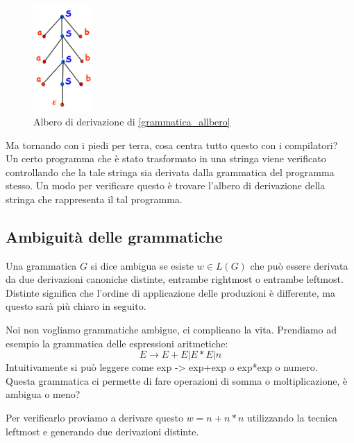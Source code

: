 \documentclass[class=book, crop=false, oneside, 12pt]{standalone}
\begin{document}
\begin{figure}[H]
	\centering
	\includegraphics[width=0.2\textwidth,keepaspectratio]{albero_di_derivazione}
    \caption{Albero di derivazione di \ref{grammatica_allbero}}
    \label{albero_di_derivazione}
\end{figure}
Ma tornando con i piedi per terra, cosa centra tutto questo con i compilatori?\\
Un certo programma che è stato trasformato in una stringa viene verificato controllando che la tale stringa sia derivata dalla grammatica del programma stesso. Un modo per verificare questo è trovare l’albero di derivazione della stringa che rappresenta il tal programma.

\subsection{Ambiguità delle grammatiche}
Una grammatica $G$ si dice ambigua se esiste $w \in L(G)$ che può essere derivata da due derivazioni canoniche distinte, entrambe rightmost o entrambe leftmost. Distinte significa che l'ordine di applicazione delle produzioni è differente, ma questo sarà più chiaro in seguito.

Noi non vogliamo grammatiche ambigue, ci complicano la vita.
Prendiamo ad esempio la grammatica delle espressioni aritmetiche:
\begin{equation}
    E \to E+E | E*E |  n
\end{equation}
Intuitivamente si può leggere come exp -> exp+exp  o  exp*exp  o  numero.\\
Questa grammatica ci permette di fare operazioni di somma o moltiplicazione, è ambigua o meno?

Per verificarlo proviamo a derivare questo $w = n+n*n$ utilizzando la tecnica leftmost e generando due derivazioni distinte.
\end{document}
